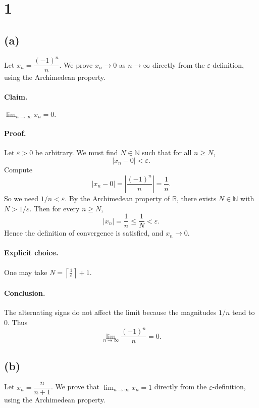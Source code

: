 \documentclass[12pt,a4paper]{article}
\theoremstyle{definition}
\theoremstyle{remark}
\begin{document}
\section*{1}

\subsection*{(a)}
Let \(x_n = \dfrac{(-1)^n}{n}\). We prove \(x_n \to 0\) as \(n\to\infty\) directly from the \(\varepsilon\)-definition, using the Archimedean property.

\paragraph{Claim.} \(\displaystyle \lim_{n\to\infty} x_n = 0.\)

\paragraph{Proof.}
Let \(\varepsilon>0\) be arbitrary. We must find \(N\in\mathbb{N}\) such that for all \(n\ge N\),
\[
|x_n - 0| < \varepsilon.
\]
Compute
\[
|x_n - 0| = \left|\frac{(-1)^n}{n}\right| = \frac{1}{n}.
\]
So we need \(1/n < \varepsilon\). By the Archimedean property of \(\mathbb{R}\), there exists \(N\in\mathbb{N}\) with \(N > 1/\varepsilon\). Then for every \(n\ge N\),
\[
|x_n| = \frac{1}{n} \le \frac{1}{N} < \varepsilon.
\]
Hence the definition of convergence is satisfied, and \(x_n \to 0\).

\paragraph{Explicit choice.} One may take \(N = \left\lceil \frac{1}{\varepsilon} \right\rceil + 1\).

\paragraph{Conclusion.} The alternating signs do not affect the limit because the magnitudes \(1/n\) tend to \(0\). Thus
\[
\boxed{\lim_{n\to\infty} \frac{(-1)^n}{n} = 0.}
\]


\subsection*{(b)}
Let \(x_n = \dfrac{n}{n+1}\). We prove that \(\displaystyle \lim_{n\to\infty} x_n = 1\) directly from the \(\varepsilon\)-definition, using the Archimedean property.
\end{document}
